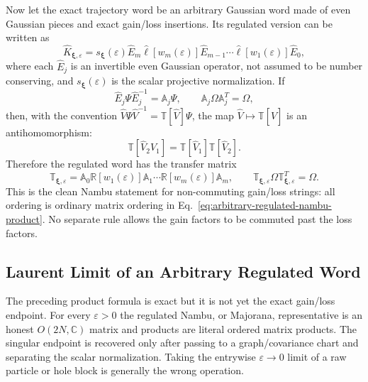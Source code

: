 \documentclass[aps,prb,onecolumn,nofootinbib,superscriptaddress]{revtex4-2}
\newcommand{\bxi}{{\boldsymbol{\xi}}}
\theoremstyle{plain}
\theoremstyle{definition}
\begin{document}
Now let the exact trajectory word be an arbitrary Gaussian word made of even
Gaussian pieces and exact gain/loss insertions.  Its regulated version can be
written as
\begin{equation}
  \hat K_{\bxi,\varepsilon}
  =
  s_{\bxi}(\varepsilon)
  \hat E_m\hat\ell[w_m(\varepsilon)]\hat E_{m-1}\cdots
  \hat\ell[w_1(\varepsilon)]\hat E_0,
  \label{eq:arbitrary-regulated-gaussian-word}
\end{equation}
where each \(\hat E_j\) is an invertible even Gaussian operator, not assumed to
be number conserving, and \(s_{\bxi}(\varepsilon)\) is the scalar projective
normalization.  If
\begin{equation}
  \hat E_j\Psi\hat E_j^{-1}=\mathbb A_j\Psi,
  \qquad
  \mathbb A_j\Omega\mathbb A_j^T=\Omega,
  \label{eq:even-nambu-transfer}
\end{equation}
then, with the convention \(\hat V\Psi\hat V^{-1}=\mathbb T[\hat V]\Psi\),
the map \(\hat V\mapsto\mathbb T[\hat V]\) is an antihomomorphism:
\begin{equation}
  \mathbb T[\hat V_2\hat V_1]
  =
  \mathbb T[\hat V_1]\mathbb T[\hat V_2] .
  \label{eq:nambu-antihomomorphism}
\end{equation}
Therefore the regulated word has the transfer matrix
\begin{equation}
  \mathbb T_{\bxi,\varepsilon}
  =
  \mathbb A_0\mathbb R[w_1(\varepsilon)]\mathbb A_1\cdots
  \mathbb R[w_m(\varepsilon)]\mathbb A_m,
  \qquad
  \mathbb T_{\bxi,\varepsilon}\Omega\mathbb T_{\bxi,\varepsilon}^T=\Omega .
  \label{eq:arbitrary-regulated-nambu-product}
\end{equation}
This is the clean Nambu statement for non-commuting gain/loss strings: all
ordering is ordinary matrix ordering in Eq.~\eqref{eq:arbitrary-regulated-nambu-product}.
No separate rule allows the gain factors to be commuted past the loss factors.

\subsection{Laurent Limit of an Arbitrary Regulated Word}
\label{sec:regulated-word-laurent-limit}

The preceding product formula is exact but it is not yet the exact
gain/loss endpoint.  For every \(\varepsilon>0\) the regulated Nambu, or
Majorana, representative is an honest \(O(2N,\mathbb C)\) matrix and products
are literal ordered matrix products.  The singular endpoint is recovered only
after passing to a graph/covariance chart and separating the scalar
normalization.  Taking the entrywise \(\varepsilon\to0\) limit of a raw
particle or hole block is generally the wrong operation.
\end{document}
